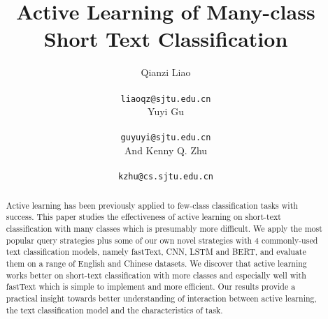 \documentclass[11pt]{article}
\title{Active Learning of Many-class Short Text Classification}
\author{Qianzi Liao \\
	\institution{Shanghai Jiao Tong University} \\
	{\tt liaoqz@sjtu.edu.cn} \\\And
	Yuyi Gu \\
	\institution{Shanghai Jiao Tong University} \\
	{\tt guyuyi@sjtu.edu.cn} \\And
	Kenny Q. Zhu \\
	\institution{Shanghai Jiao Tong University} \\
	{\tt kzhu@cs.sjtu.edu.cn}
}
\theoremstyle{definition}
\newcommand{\EVE}[1]{\textcolor{red}{eve: #1}}
\begin{document}
\maketitle
\begin{abstract}
Active learning has been previously applied to few-class classification tasks
with success. This paper studies the effectiveness of active learning on
short-text classification with many classes which is presumably more difficult.
We apply the most popular query strategies plus some of our own
novel strategies with 4 commonly-used text classification models, 
namely fastText, CNN, LSTM and BERT, and evaluate them on a range of 
English and Chinese datasets. We discover that active learning 
works better on short-text classification with more classes and 
especially well with fastText which is simple to implement and more efficient. 
Our results provide a practical insight towards 
better understanding of interaction between active learning, 
the text classification model and the characteristics of task.   
\end{abstract}





%


% 





\end{document}
